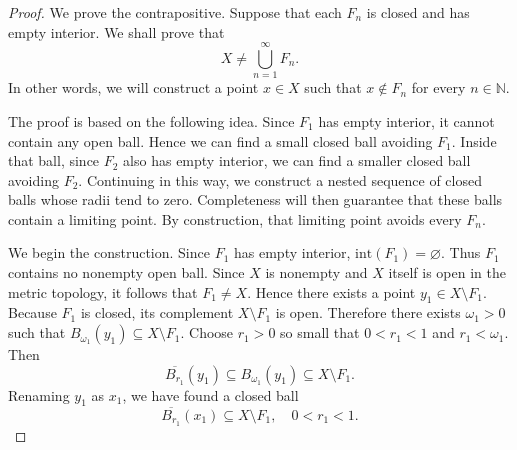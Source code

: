 \begin{proof}
    We prove the contrapositive. Suppose that each \(F_n\) is closed and has empty interior. We shall prove that
    \[
        X \neq \bigcup_{n=1}^{\infty} F_n.
    \]
    In other words, we will construct a point \(x \in X\) such that \(x \notin F_n\) for every \(n \in \mathbb{N}\).

    The proof is based on the following idea. Since \(F_1\) has empty interior, it cannot contain any open ball. Hence we can find a small closed ball avoiding \(F_1\). Inside that ball, since \(F_2\) also has empty interior, we can find a smaller closed ball avoiding \(F_2\). Continuing in this way, we construct a nested sequence of closed balls whose radii tend to zero. Completeness will then guarantee that these balls contain a limiting point. By construction, that limiting point avoids every \(F_n\).

    We begin the construction. Since \(F_1\) has empty interior, \(\mathrm{int}(F_1) = \varnothing\). Thus \(F_1\) contains no nonempty open ball. Since \(X\) is nonempty and \(X\) itself is open in the metric topology, it follows that \(F_1 \neq X\). Hence there exists a point \(y_1 \in X \setminus F_1\). Because \(F_1\) is closed, its complement \(X \setminus F_1\) is open. Therefore there exists \(\omega_1 > 0\) such that \(B_{\omega_1}(y_1) \subseteq X \setminus F_1\). Choose \(r_1 > 0\) so small that \(0 < r_1 < 1\) and \(r_1 < \omega_1\). Then
    \[
        \overline{B_{r_1}}(y_1) \subseteq B_{\omega_1}(y_1) \subseteq X \setminus F_1.
    \]
    Renaming \(y_1\) as \(x_1\), we have found a closed ball
    \[
        \overline{B_{r_1}}(x_1) \subseteq X \setminus F_1, \quad 0 < r_1 < 1.
    \]


\end{proof}
